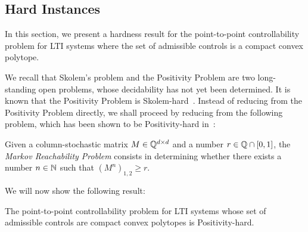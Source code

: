 \subsection{Hard Instances}

In this section, we present a hardness result for the point-to-point controllability problem for LTI systems where the set of admissible controls is a compact convex polytope.

We recall that Skolem's problem and the Positivity Problem are two long-standing open problems, whose decidability has not yet been determined.
It is known that the Positivity Problem is Skolem-hard~\cite{OW14:SODA}.
Instead of reducing from the Positivity Problem directly, we shall proceed by reducing from the following problem, which has been shown to be Positivity-hard in~\cite{MRP}:
\begin{definition}
Given a column-stochastic matrix $M \in \mathbb{Q}^{d \times d}$ and a number $r \in \mathbb{Q} \cap [0,1]$,
the \emph{Markov Reachability Problem} consists in determining whether there exists a number $n \in \mathbb{N}$ such that ${\left( M^{n} \right)}_{1,2} \geq r$.
\end{definition}

We will now show the following result:

\begin{theorem}
The point-to-point controllability problem for LTI systems whose set of admissible controls are compact convex polytopes is Positivity-hard.
\end{theorem}

